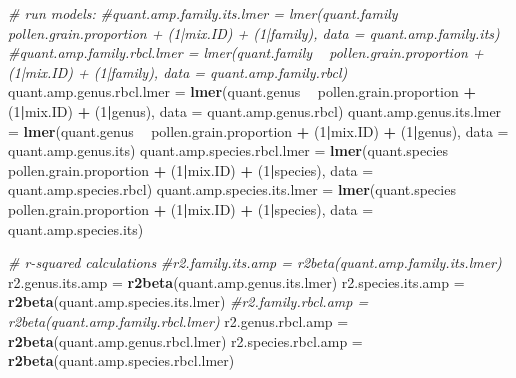 \documentclass[
]{article}
\newenvironment{Shaded}{\begin{snugshade}}{\end{snugshade}}
\newcommand{\CommentTok}[1]{\textcolor[rgb]{0.56,0.35,0.01}{\textit{#1}}}
\newcommand{\DataTypeTok}[1]{\textcolor[rgb]{0.13,0.29,0.53}{#1}}
\newcommand{\DecValTok}[1]{\textcolor[rgb]{0.00,0.00,0.81}{#1}}
\newcommand{\KeywordTok}[1]{\textcolor[rgb]{0.13,0.29,0.53}{\textbf{#1}}}
\newcommand{\NormalTok}[1]{#1}
\newcommand{\OperatorTok}[1]{\textcolor[rgb]{0.81,0.36,0.00}{\textbf{#1}}}
\newcommand{\StringTok}[1]{\textcolor[rgb]{0.31,0.60,0.02}{#1}}
\begin{document}
\begin{Shaded}
\begin{Highlighting}[]
\CommentTok{# run models:}
\CommentTok{#quant.amp.family.its.lmer = lmer(quant.family ~ pollen.grain.proportion + (1|mix.ID) + (1|family), data = quant.amp.family.its)}
\CommentTok{#quant.amp.family.rbcl.lmer = lmer(quant.family ~ pollen.grain.proportion + (1|mix.ID) + (1|family), data = quant.amp.family.rbcl)}
\NormalTok{quant.amp.genus.rbcl.lmer =}\StringTok{ }\KeywordTok{lmer}\NormalTok{(quant.genus }\OperatorTok{~}\StringTok{ }\NormalTok{pollen.grain.proportion }\OperatorTok{+}\StringTok{ }\NormalTok{(}\DecValTok{1}\OperatorTok{|}\NormalTok{mix.ID) }\OperatorTok{+}\StringTok{ }\NormalTok{(}\DecValTok{1}\OperatorTok{|}\NormalTok{genus), }\DataTypeTok{data =}\NormalTok{ quant.amp.genus.rbcl)}
\NormalTok{quant.amp.genus.its.lmer =}\StringTok{ }\KeywordTok{lmer}\NormalTok{(quant.genus }\OperatorTok{~}\StringTok{ }\NormalTok{pollen.grain.proportion }\OperatorTok{+}\StringTok{ }\NormalTok{(}\DecValTok{1}\OperatorTok{|}\NormalTok{mix.ID) }\OperatorTok{+}\StringTok{ }\NormalTok{(}\DecValTok{1}\OperatorTok{|}\NormalTok{genus), }\DataTypeTok{data =}\NormalTok{ quant.amp.genus.its)}
\NormalTok{quant.amp.species.rbcl.lmer =}\StringTok{ }\KeywordTok{lmer}\NormalTok{(quant.species }\OperatorTok{~}\StringTok{ }\NormalTok{pollen.grain.proportion }\OperatorTok{+}\StringTok{ }\NormalTok{(}\DecValTok{1}\OperatorTok{|}\NormalTok{mix.ID) }\OperatorTok{+}\StringTok{ }\NormalTok{(}\DecValTok{1}\OperatorTok{|}\NormalTok{species), }\DataTypeTok{data =}\NormalTok{ quant.amp.species.rbcl)}
\NormalTok{quant.amp.species.its.lmer =}\StringTok{ }\KeywordTok{lmer}\NormalTok{(quant.species }\OperatorTok{~}\StringTok{ }\NormalTok{pollen.grain.proportion }\OperatorTok{+}\StringTok{ }\NormalTok{(}\DecValTok{1}\OperatorTok{|}\NormalTok{mix.ID) }\OperatorTok{+}\StringTok{ }\NormalTok{(}\DecValTok{1}\OperatorTok{|}\NormalTok{species), }\DataTypeTok{data =}\NormalTok{ quant.amp.species.its)}

\CommentTok{# r-squared calculations}
\CommentTok{#r2.family.its.amp = r2beta(quant.amp.family.its.lmer)}
\NormalTok{r2.genus.its.amp =}\StringTok{ }\KeywordTok{r2beta}\NormalTok{(quant.amp.genus.its.lmer)}
\NormalTok{r2.species.its.amp =}\StringTok{ }\KeywordTok{r2beta}\NormalTok{(quant.amp.species.its.lmer)}
\CommentTok{#r2.family.rbcl.amp = r2beta(quant.amp.family.rbcl.lmer)}
\NormalTok{r2.genus.rbcl.amp =}\StringTok{ }\KeywordTok{r2beta}\NormalTok{(quant.amp.genus.rbcl.lmer)}
\NormalTok{r2.species.rbcl.amp =}\StringTok{ }\KeywordTok{r2beta}\NormalTok{(quant.amp.species.rbcl.lmer)}


\end{Highlighting}
\end{Shaded}
\end{document}
